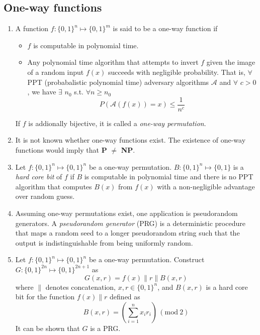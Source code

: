 \documentclass[10pt]{article}
\begin{document}
\begin{multicols}{2}
\begin{addmargin}[0.8em]{0.5em}
    \subsection{One-way functions}
    \begin{enumerate}[label=(\alph*)]
        \item A function $f : \{0, 1 \}^n \mapsto \{0, 1\}^m$ is said to be a one-way function if 
        \begin{itemize}
            \item $f$ is computable in polynomial time.
            \item Any polynomial time algorithm that attempts to invert $f$ given the image of a random input $f(x)$ succeeds with negligible probability. That is, $\forall$ PPT (probabalistic polynomial time) adversary algorithms $\mathcal{A}$ and $\forall$ $c>0$, we have $\exists$ $n_0$ s.t. $\forall n \geq n_0$
            $$
            P(\mathcal{A}(f(x)) = x) \leq \frac{1}{n^c}
            $$
        \end{itemize}
        If $f$ is addionally bijective, it is called a \textit{one-way permutation}.
        \item It is not known whether one-way functions exist. The existence of one-way functions would imply that \textbf{P} $\neq$ \textbf{NP}.
        \item Let $f : \{0, 1 \}^n \mapsto \{0, 1\}^n$ be a one-way permutation. $B : \{0, 1 \}^n \mapsto \{0, 1\}$ is a \textit{hard core bit} of $f$ if $B$ is computable in polynomial time and there is no PPT algorithm that computes $B(x)$ from $f(x)$ with a non-negligible advantage over random guess.
        \item Assuming one-way permutations exist, one application is pseudorandom generators. A \textit{pseudorandom generator} (PRG) is a deterministic procedure that maps a random seed to a longer pseudorandom string such that the output is indistinguishable from being uniformly random. 
        \item Let $f : \{0, 1 \}^n \mapsto \{0, 1\}^n$ be a one-way permutation. Construct $G: \{0, 1 \}^{2n} \mapsto \{0, 1\}^{2n+1}$ as
        $$
        G(x,r) = f(x) \| r \| B(x,r)
        $$
        where $\|$ denotes concatenation, $x,r \in \{ 0, 1 \}^n$, and $B(x,r)$ is a hard core bit for the function $f(x) \| r$ defined as
        $$
        B(x,r) = \left( \sum_{i=1}^{n} x_i r_i  \right) \, (\text{mod}\ 2)
        $$
        It can be shown that $G$ is a PRG.
    \end{enumerate}
\end{addmargin}    


\end{multicols}
\end{document}
